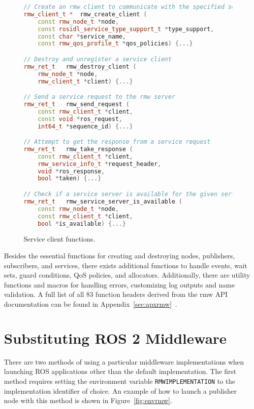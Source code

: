         \begin{figure}[htbp]
            \begin{lstlisting}[language=C++]
// Create an rmw client to communicate with the specified service
rmw_client_t * 	rmw_create_client (
    const rmw_node_t *node, 
    const rosidl_service_type_support_t *type_support, 
    const char *service_name, 
    const rmw_qos_profile_t *qos_policies) {...}

// Destroy and unregister a service client
rmw_ret_t 	rmw_destroy_client (
    rmw_node_t *node, 
    rmw_client_t *client) {...}

// Send a service request to the rmw server
rmw_ret_t 	rmw_send_request (
    const rmw_client_t *client, 
    const void *ros_request, 
    int64_t *sequence_id) {...}

// Attempt to get the response from a service request
rmw_ret_t 	rmw_take_response (
    const rmw_client_t *client, 
    rmw_service_info_t *request_header, 
    void *ros_response, 
    bool *taken) {...}

// Check if a service server is available for the given service client
rmw_ret_t 	rmw_service_server_is_available (
    const rmw_node_t *node, 
    const rmw_client_t *client, 
    bool *is_available) {...}
\end{lstlisting}
            \caption{Service client functions.}
            \label{fig:funclient}
        \end{figure}


    \pagebreak
    Besides the essential functions for creating and destroying nodes, publishers, subscribers, and services, there exists additional functions to handle events, wait sets, guard conditions, \ac{QoS} policies, and allocators. Additionally, there are utility functions and macros for handling errors, customizing log outputs and name validation. A full list of all 83 function headers derived from the \textsf{rmw} \ac{API} documentation can be found in Appendix~\ref{sec:apxrmw}~\cite{rmwapi}.

\section{Substituting ROS 2 Middleware}

    There are two methods of using a particular middleware implementations when launching \ac{ROS} applications other than the default implementation. The first method requires setting the environment variable \small\texttt{RMW\smallunderscore IMPLEMENTATION} \normalsize to the implementation identifier of choice. An example of how to launch a publisher node with this method is shown in Figure~\ref{fig:envrmw}.

